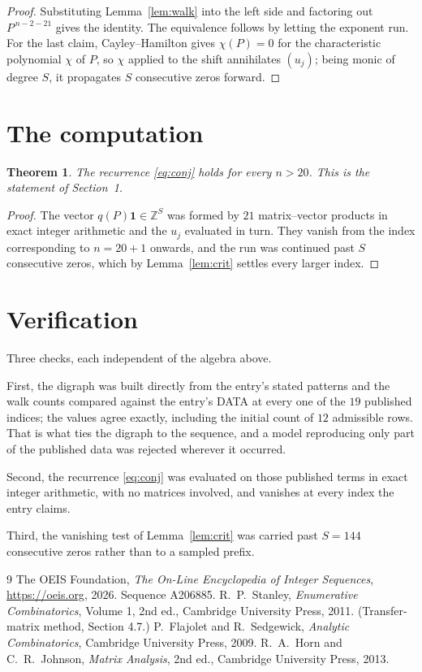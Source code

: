 \documentclass[11pt,a4paper]{article}
\theoremstyle{plain}
\newtheorem{theorem}{Theorem}
\theoremstyle{definition}
\begin{document}
\begin{proof}
Substituting Lemma~\ref{lem:walk} into the left side and factoring out
$P^{\,n-2-21}$ gives the identity. The equivalence follows by letting the exponent
run. For the last claim, Cayley--Hamilton gives $\chi(P)=0$ for the characteristic
polynomial $\chi$ of $P$, so $\chi$ applied to the shift annihilates $(u_j)$; being monic of
degree $S$, it propagates $S$ consecutive zeros forward.
\end{proof}

\section{The computation}

\begin{theorem}
The recurrence \eqref{eq:conj} holds for every $n>20$. This is the statement of
Section~1.
\end{theorem}

\begin{proof}
The vector $q(P)\mathbf{1}\in\mathbb{Z}^{S}$ was formed by $21$ matrix--vector
products in exact integer arithmetic and the $u_j$ evaluated in turn. They vanish from the
index corresponding to $n=20+1$ onwards, and the run was continued past $S$ consecutive
zeros, which by Lemma~\ref{lem:crit} settles every larger index.
\end{proof}

\section{Verification}

Three checks, each independent of the algebra above.

First, the digraph was built directly from the entry's stated patterns and the walk counts
compared against the entry's DATA at every one of the $19$ published indices; the
values agree exactly, including the initial count of $12$ admissible rows. That is
what ties the digraph to the sequence, and a model reproducing only part of the published
data was rejected wherever it occurred.

Second, the recurrence \eqref{eq:conj} was evaluated on those published terms in exact
integer arithmetic, with no matrices involved, and vanishes at every index the entry claims.

Third, the vanishing test of Lemma~\ref{lem:crit} was carried past $S=144$ consecutive
zeros rather than to a sampled prefix.

\begin{thebibliography}{9}
 The OEIS Foundation, \emph{The On-Line Encyclopedia of Integer
Sequences}, \url{https://oeis.org}, 2026. Sequence A206885.
 R.~P.~Stanley, \emph{Enumerative Combinatorics}, Volume 1, 2nd ed.,
Cambridge University Press, 2011. (Transfer-matrix method, Section 4.7.)
 P.~Flajolet and R.~Sedgewick, \emph{Analytic Combinatorics}, Cambridge
University Press, 2009.
 R.~A.~Horn and C.~R.~Johnson, \emph{Matrix Analysis}, 2nd ed., Cambridge
University Press, 2013.
\end{thebibliography}
\end{document}
